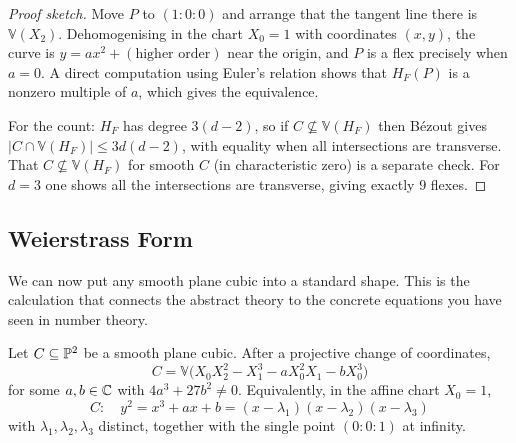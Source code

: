 \documentclass[a4paper]{scrartcl}
\newcommand{\V}{\mathbb{V}}
\begin{document}
\begin{proof}[Proof sketch]
	Move $P$ to $(1:0:0)$ and arrange that the tangent line there is $\V(X_2)$. Dehomogenising in the chart $X_0 = 1$ with coordinates $(x,y)$, the curve is $y = a x^2 + (\text{higher order})$ near the origin, and $P$ is a flex precisely when $a = 0$. A direct computation using Euler's relation shows that $H_F(P)$ is a nonzero multiple of $a$, which gives the equivalence.

	For the count: $H_F$ has degree $3(d-2)$, so if $C \not\subseteq \V(H_F)$ then B\'ezout gives $|C \cap \V(H_F)| \leq 3d(d-2)$, with equality when all intersections are transverse. That $C \not\subseteq \V(H_F)$ for smooth $C$ (in characteristic zero) is a separate check. For $d = 3$ one shows all the intersections are transverse, giving exactly $9$ flexes.
\end{proof}

\subsection{Weierstrass Form}

We can now put any smooth plane cubic into a standard shape. This is the calculation that connects the abstract theory to the concrete equations you have seen in number theory.

\begin{theorem}\label{ag-thm:weierstrass}
	Let $C \subseteq \mathbb{P}^2$ be a smooth plane cubic. After a projective change of coordinates,
	$$C = \V\big(X_0X_2^2 - X_1^3 - aX_0^2X_1 - bX_0^3\big)$$
	for some $a,b \in \mathbb{C}$ with $4a^3 + 27b^2 \neq 0$. Equivalently, in the affine chart $X_0 = 1$,
	$$C \colon\quad y^2 = x^3 + ax + b = (x-\lambda_1)(x-\lambda_2)(x-\lambda_3)$$
	with $\lambda_1,\lambda_2,\lambda_3$ distinct, together with the single point $(0:0:1)$ at infinity.
\end{theorem}
\end{document}
